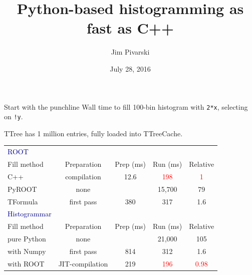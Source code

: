 \documentclass{beamer}
\title[2016-07-28-root-jit]{Python-based histogramming as fast as C++}
\author{Jim Pivarski}
\institute{Princeton University -- DIANA}
\date{July 28, 2016}
\begin{document}

\begin{frame}
  \titlepage
\end{frame}



\begin{frame}{Start with the punchline}
\vspace{0.25 cm}
Wall time to fill 100-bin histogram with {\tt \small 2*x}, selecting on {\tt \small !y}.

TTree has 1 million entries, fully loaded into TTreeCache.

\renewcommand{\arraystretch}{1.2}
\vspace{0.25 cm}
\begin{tabular}{l c c c c}
\textcolor{darkblue}{ROOT} & & & & \\
Fill method & Preparation & Prep (ms) & Run (ms) & Relative \\\hline
C++ & compilation & 12.6 & \textcolor{red}{198} & \textcolor{red}{1} \\
PyROOT & none & & 15,700 & 79 \\
TFormula & first pass & 380 & 317 & 1.6\vspace{0.25 cm} \\
\textcolor{darkblue}{Histogrammar} & & & & \\
Fill method & Preparation & Prep (ms) & Run (ms) & Relative \\\hline
pure Python & none & & 21,000 & 105 \\
with Numpy & first pass & 814 & 312 & 1.6 \\
with ROOT & JIT-compilation & 219 & \textcolor{red}{196} & \textcolor{red}{0.98} \\
\end{tabular}
\end{frame}
\end{document}
